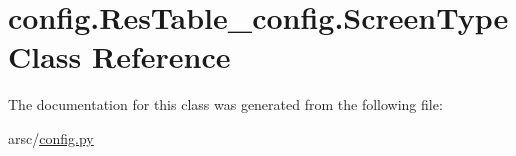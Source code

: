 \hypertarget{classconfig_1_1ResTable__config_1_1ScreenType}{}\section{config.\+Res\+Table\+\_\+config.\+Screen\+Type Class Reference}
\label{classconfig_1_1ResTable__config_1_1ScreenType}


The documentation for this class was generated from the following file\+:\begin{DoxyCompactItemize}
\item 
arsc/\mbox{\hyperlink{config_8py}{config.\+py}}\end{DoxyCompactItemize}
